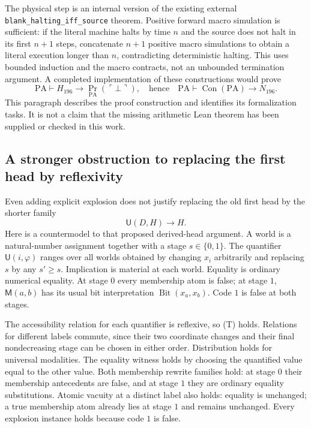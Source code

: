 The physical step is an internal version of the existing external
\texttt{blank\_halting\_iff\_source} theorem.  Positive forward macro
simulation is sufficient: if the literal machine halts by time $n$
and the source does not halt in its first $n+1$ steps, concatenate
$n+1$ positive macro simulations to obtain a literal execution longer
than $n$, contradicting deterministic halting.  This uses bounded
induction and the macro contracts, not an unbounded termination
argument.  A completed implementation of these constructions would
prove
\[
 \mathrm{PA}\vdash H_{196}\to
 \operatorname{Pr}_{\mathrm{PA}}(\ulcorner\bot\urcorner),
 \quad\text{hence}\quad
 \mathrm{PA}\vdash\operatorname{Con}(\mathrm{PA})\to N_{196}.
\]
This paragraph describes the proof construction and identifies its
formalization tasks.  It is not a claim that the missing arithmetic Lean
theorem has been supplied or checked in this work.

\subsection{A stronger obstruction to replacing the first head by reflexivity}

Even adding explicit explosion does not justify replacing the old first
head by the shorter family
\[
 \mathsf U(D,H)\to H.
 \tag{T}
\]
Here is a countermodel to that proposed derived-head argument.  A world
is a natural-number assignment together with a stage $s\in\{0,1\}$.
The quantifier $\mathsf U(i,\varphi)$ ranges over all worlds obtained by
changing $x_i$ arbitrarily and replacing $s$ by any $s'\ge s$.
Implication is material at each world.  Equality is ordinary numerical
equality.  At stage $0$ every membership atom is false; at stage $1$,
$\mathsf M(a,b)$ has its usual bit interpretation
$\operatorname{Bit}(x_a,x_b)$.  Code $1$ is false at both stages.

The accessibility relation for each quantifier is reflexive, so
\textup{(T)} holds.  Relations for different labels commute, since their
two coordinate changes and their final nondecreasing stage can be chosen
in either order.  Distribution holds for universal modalities.  The
equality witness holds by choosing the quantified value equal to the
other value.  Both membership rewrite families hold: at stage $0$ their
membership antecedents are false, and at stage $1$ they are ordinary
equality substitutions.  Atomic vacuity at a distinct label also holds:
equality is unchanged; a true membership atom already lies at stage $1$
and remains unchanged.  Every explosion instance holds because code
$1$ is false.


